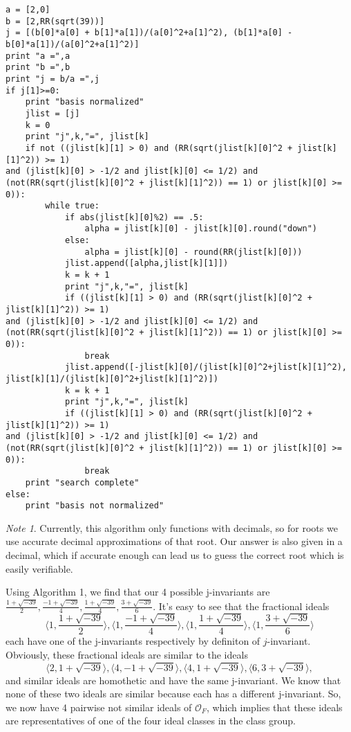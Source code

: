 \documentclass[12pt]{amsart}
\theoremstyle{definition}
\theoremstyle{remark}
\newtheorem*{note}{Note}
\begin{document}
            \begin{lstlisting}[style = Python]
a = [2,0]
b = [2,RR(sqrt(39))]
j = [(b[0]*a[0] + b[1]*a[1])/(a[0]^2+a[1]^2), (b[1]*a[0] - b[0]*a[1])/(a[0]^2+a[1]^2)]
print "a =",a
print "b =",b
print "j = b/a =",j
if j[1]>=0:
    print "basis normalized"
    jlist = [j]
    k = 0
    print "j",k,"=", jlist[k]
    if not ((jlist[k][1] > 0) and (RR(sqrt(jlist[k][0]^2 + jlist[k][1]^2)) >= 1) 
and (jlist[k][0] > -1/2 and jlist[k][0] <= 1/2) and 
(not(RR(sqrt(jlist[k][0]^2 + jlist[k][1]^2)) == 1) or jlist[k][0] >= 0)):
        while true:
            if abs(jlist[k][0]%2) == .5:
                alpha = jlist[k][0] - jlist[k][0].round("down")
            else:
                alpha = jlist[k][0] - round(RR(jlist[k][0]))
            jlist.append([alpha,jlist[k][1]])
            k = k + 1 
            print "j",k,"=", jlist[k]
            if ((jlist[k][1] > 0) and (RR(sqrt(jlist[k][0]^2 + jlist[k][1]^2)) >= 1) 
and (jlist[k][0] > -1/2 and jlist[k][0] <= 1/2) and 
(not(RR(sqrt(jlist[k][0]^2 + jlist[k][1]^2)) == 1) or jlist[k][0] >= 0)):
                break
            jlist.append([-jlist[k][0]/(jlist[k][0]^2+jlist[k][1]^2), 
jlist[k][1]/(jlist[k][0]^2+jlist[k][1]^2)])
            k = k + 1 
            print "j",k,"=", jlist[k]
            if ((jlist[k][1] > 0) and (RR(sqrt(jlist[k][0]^2 + jlist[k][1]^2)) >= 1) 
and (jlist[k][0] > -1/2 and jlist[k][0] <= 1/2) and 
(not(RR(sqrt(jlist[k][0]^2 + jlist[k][1]^2)) == 1) or jlist[k][0] >= 0)):
                break
    print "search complete"
else:
    print "basis not normalized"
        \end{lstlisting}

\begin{note}
    Currently, this algorithm only functions with decimals, so for roots we use accurate decimal approximations of that root. Our answer is also given in a decimal, which if accurate enough can lead us to guess the correct root which is easily verifiable.
\end{note}

Using Algorithm 1, we find that our 4 possible j-invariants are $\frac{1+\sqrt{-39}}{2}, \frac{-1+\sqrt{-39}}{4}, \frac{1+\sqrt{-39}}{4}, \frac{3+\sqrt{-39}}{6}$. It's easy to see that the fractional ideals $$\langle 1, \frac{1+\sqrt{-39}}{2}\rangle,\langle 1 , \frac{-1+\sqrt{-39}}{4}\rangle, \langle 1 , \frac{1+\sqrt{-39}}{4}\rangle, \langle 1 , \frac{3+\sqrt{-39}}{6}\rangle$$ each have one of the j-invariants respectively by definiton of $j$-invariant. Obviously, these fractional ideals are similar to the ideals $$\langle 2 , 1+\sqrt{-39}\rangle, \langle 4 , -1+\sqrt{-39}\rangle, \langle 4 , 1+\sqrt{-39}\rangle, \langle 6 , 3+\sqrt{-39}\rangle,$$ and similar ideals are homothetic and have the same j-invariant. We know that none of these two ideals are similar because each has a different j-invariant. So, we now have 4 pairwise not similar ideals of $\mathcal{O}_F$, which implies that these ideals are representatives of one of the four ideal classes in the class group.
\end{document}
